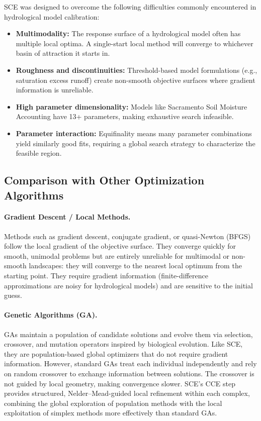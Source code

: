\documentclass[11pt,letterpaper]{article}
\begin{document}
SCE was designed to overcome the following difficulties commonly encountered in hydrological model calibration:

\begin{itemize}
    \item \textbf{Multimodality:} The response surface of a hydrological model often has multiple local optima. A single-start local method will converge to whichever basin of attraction it starts in.
    \item \textbf{Roughness and discontinuities:} Threshold-based model formulations (e.g., saturation excess runoff) create non-smooth objective surfaces where gradient information is unreliable.
    \item \textbf{High parameter dimensionality:} Models like Sacramento Soil Moisture Accounting have 13+ parameters, making exhaustive search infeasible.
    \item \textbf{Parameter interaction:} Equifinality means many parameter combinations yield similarly good fits, requiring a global search strategy to characterize the feasible region.
\end{itemize}

\subsection{Comparison with Other Optimization Algorithms}

\paragraph{Gradient Descent / Local Methods.}
Methods such as gradient descent, conjugate gradient, or quasi-Newton (BFGS) follow the local gradient of the objective surface. They converge quickly for smooth, unimodal problems but are entirely unreliable for multimodal or non-smooth landscapes: they will converge to the nearest local optimum from the starting point. They require gradient information (finite-difference approximations are noisy for hydrological models) and are sensitive to the initial guess.

\paragraph{Genetic Algorithms (GA).}
GAs maintain a population of candidate solutions and evolve them via selection, crossover, and mutation operators inspired by biological evolution. Like SCE, they are population-based global optimizers that do not require gradient information. However, standard GAs treat each individual independently and rely on random crossover to exchange information between solutions. The crossover is not guided by local geometry, making convergence slower. SCE's CCE step provides structured, Nelder--Mead-guided local refinement within each complex, combining the global exploration of population methods with the local exploitation of simplex methods more effectively than standard GAs.
\end{document}
